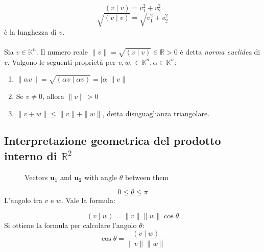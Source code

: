 \documentclass[12pt]{article}
\begin{document}
\[(v \mid v) = v_1^2 +  v_2^2 \]
\[\sqrt{(v \mid v)} = \sqrt{v_1^2 + v_2^2}\]
è la lunghezza di $v$. \\\\
Sia $v \in \mathbb{K}^n$. Il numero reale $ \|v\| = \sqrt{(v \mid v)} \in \mathbb{R} > 0$ è detta \textit{norma euclidea} di $v$. Valgono le seguenti proprietà per $v, w, \in \mathbb{K}^n, \alpha \in \mathbb{K}^n$:

\begin{enumerate}
    \item $\|\alpha v\| = \sqrt{(\alpha v \mid \alpha v)} = |\alpha| \|v\|$
    \item Se $v \neq 0$, allora $\|v\| > 0$
    \item $\|v + w\| \le \|v\| + \|w\|$, detta disuguaglianza triangolare.
\end{enumerate}

\subsection{Interpretazione geometrica del prodotto interno di $\mathbb{R}^2$}

\begin{figure}[H]
\centering
{}
\caption{Vectors $\mathbf{u_1}$ and $\mathbf{u_2}$ with angle $\theta$ between them}
\end{figure}

\[0 \le \theta \le \pi\] L'angolo tra $v$ e $w$. Vale la formula:

\[(v \mid w) = \|v\|\|w\| \cos{\theta}\]
Si ottiene la formula per calcolare l'angolo $\theta$:
\[\cos{\theta} = \frac{(v \mid w)}{\|v\|\|w\|}\]
\end{document}
